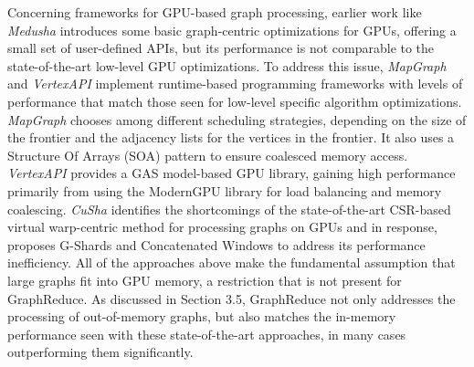 Concerning frameworks for GPU-based graph processing, earlier work like \textit{Medusha} \cite{medusa} introduces some basic
graph-centric optimizations for GPUs, offering a small set of user-defined APIs, but its performance is not comparable to the
state-of-the-art low-level GPU optimizations. To address this issue, \textit{MapGraph} \cite{mapgraph} and \textit{VertexAPI}\cite{vertexapi}
implement runtime-based programming frameworks with levels of performance that match those seen for low-level specific algorithm optimizations. 
\textit{MapGraph} chooses among different scheduling strategies, depending on the size of the frontier and the adjacency lists 
for the vertices in the frontier. 
It also uses a Structure Of Arrays (SOA) pattern to ensure coalesced memory access. 
\textit{VertexAPI} provides a GAS model-based GPU library, gaining high performance primarily from using the 
ModernGPU \cite{moderngpu} library for load balancing and memory coalescing. \textit{CuSha} \cite{cusha} identifies the shortcomings 
of the state-of-the-art CSR-based virtual warp-centric method for processing graphs on GPUs and in response, proposes G-Shards and 
Concatenated Windows to address its performance inefficiency. All of the approaches above make the fundamental assumption that 
large graphs fit into GPU memory, a restriction that is not present for GraphReduce. As discussed in Section 3.5, GraphReduce 
not only addresses the processing of out-of-memory graphs, but also matches the in-memory performance seen with these state-of-the-art 
approaches, in many cases outperforming them significantly. 


